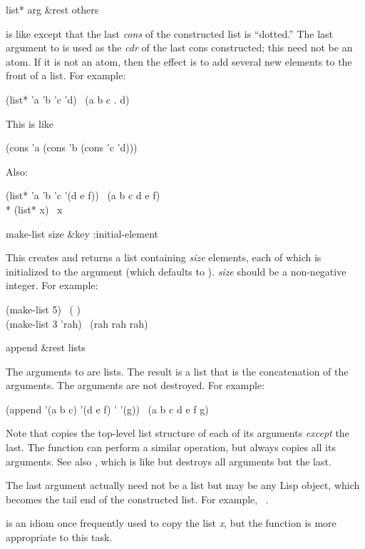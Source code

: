 \begin{defun}[Function]
list* arg &rest others

 is like  except that the last {\it cons}
of the constructed list is ``dotted.''  The last argument to 
is used as the {\it cdr} of the last cons constructed;
this need not be an atom.  If it is not an atom,
then the effect is to add several new elements to the front of a list.
For example:
\begin{lisp}
(list* 'a 'b 'c 'd) \EV\ (a b c . d)
\end{lisp}
This is like
\begin{lisp}
(cons 'a (cons 'b (cons 'c 'd)))
\end{lisp}
Also:
\begin{lisp}
(list* 'a 'b 'c '(d e f)) \EV\ (a b c d e f) \\*
(list* x) \EQ\ x
\end{lisp}
\end{defun}

\begin{defun}[Function]
make-list size &key :initial-element

This creates and returns a list containing {\it size} elements, each
of which is initialized to the 
argument (which defaults to {\false}).
{\it size} should be a non-negative integer.
For example:
\begin{lisp}
(make-list 5) \EV\ ({\false} {\false} {\false} {\false} {\false}) \\
(make-list 3  'rah) \EV\ (rah rah rah)
\end{lisp}
\end{defun}

\begin{defun}[Function]
append &rest lists

The arguments to  are lists.  The result is a list that is the
concatenation of the arguments.
The arguments are not destroyed.
For example:
\begin{lisp}
(append '(a b c) '(d e f) '{\emptylist} '(g)) \EV\ (a b c d e f g)
\end{lisp}
Note that  copies the top-level list structure of each of its
arguments {\it except} the last.
The function  can perform a similar operation, but always
copies all its arguments.  See also , which is like 
but destroys all arguments but the last.

The last argument actually need not be a list but may be any Lisp object,
which becomes the tail end of the constructed list.
For example,  \EV\ .

 is an idiom once frequently used to copy the
list {\it x}, but the  function is more appropriate to this
task.
\end{defun}

